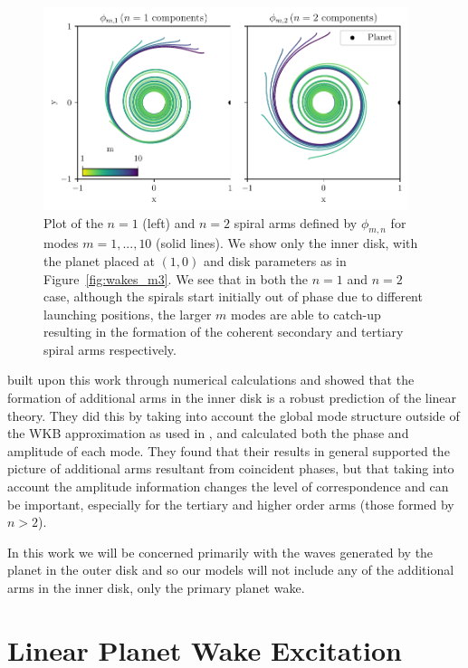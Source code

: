 \begin{figure}
    \centering
    \includegraphics[width = 0.95\textwidth]{figures/inner_n_1_and_2.pdf}
    \caption{Plot of the $n=1$ (left) and $n=2$ spiral arms defined by $\phi_{m,n}$ for modes $m=1,...,10$ (solid lines).
    We show only the inner disk, with the planet placed at $(1,0)$ and disk parameters as in Figure~\ref{fig:wakes_m3}.
    We see that in both the $n=1$ and $n=2$ case, although the spirals start initially out of phase due to different launching positions, the larger $m$ modes are able to catch-up resulting in the formation of the coherent secondary and tertiary spiral arms respectively.}
    \label{fig:additional_arms}
\end{figure}

\citet{miranda2019a} built upon this work through numerical calculations and showed that the formation of additional arms in the inner disk is a robust prediction of the linear theory.
They did this by taking into account the global mode structure outside of the WKB approximation as used in \citet{bae2018a}, and calculated both the phase and amplitude of each mode.
They found that their results in general supported the picture of additional arms resultant from coincident phases, but that taking into account the amplitude information changes the level of correspondence and can be important, especially for the tertiary and higher order arms (those formed by $n>2$).

In this work we will be concerned primarily with the waves generated by the planet in the outer disk and so our models will not include any of the additional arms in the inner disk, only the primary planet wake.

\section{Linear Planet Wake Excitation} \label{sec:linear_wake_excitation}

